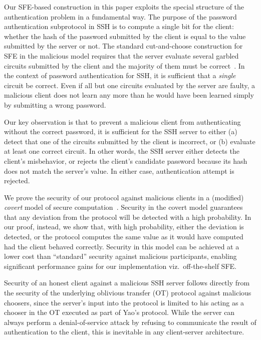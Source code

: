 Our SFE-based construction in this paper exploits the special structure
of the authentication problem in a fundamental way.  The purpose of
the password authentication subprotocol in SSH is to compute a single
bit for the client: whether the hash of the password submitted by the
client is equal to the value submitted by the server or not.  The standard
cut-and-choose construction for SFE in the malicious model requires that
the server evaluate several garbled circuits submitted by the client and
the majority of them must be correct~\cite{lindellpinkas-eurocrypt07}.
In the context of password authentication for SSH, it is sufficient that a
\emph{single} circuit be correct.  Even if all but one circuits evaluated
by the server are faulty, a malicious client does not learn any more
than he would have been learned simply by submitting a wrong password.


Our key observation is that to prevent a malicious client from
authenticating without the correct password, it is sufficient for the
SSH server to either (a) detect that one of the circuits submitted by
the client is incorrect, or (b) evaluate at least one correct circuit.
In other words, the SSH server either detects the client's misbehavior,
or rejects the client's candidate password because its hash does not match
the server's value.  In either case, authentication attempt is rejected.

We prove the security of our protocol against malicious
clients in a (modified) \emph{covert} model of secure
computation~\cite{aumannlindell,goyalmohasselsmith-eurocrypt08}.
Security in the covert model guarantees that any deviation from the
protocol will be detected with a high probability.  In our proof, instead,
we show that, with high probability, either the deviation is detected,
or the protocol computes the same value as it would have computed had the
client behaved correctly.  Security in this model can be achieved at a
lower cost than ``standard'' security against malicious participants,
enabling significant performance gains for our implementation viz.\
off-the-shelf SFE.

Security of an honest client against a malicious SSH server follows
directly from the security of the underlying oblivious transfer (OT)
protocol against malicious choosers, since the server's input into
the protocol is limited to his acting as a chooser in the OT executed
as part of Yao's protocol.  While the server can always perform a
denial-of-service attack by refusing to communicate the result of
authentication to the client, this is inevitable in any client-server
architecture.


